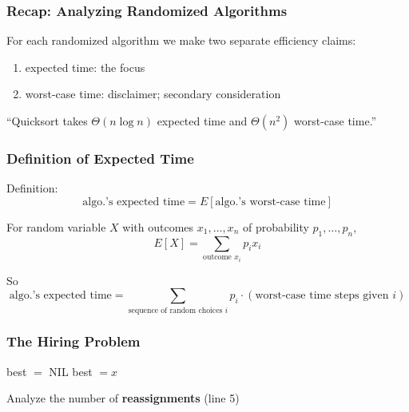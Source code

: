\documentclass[10pt,aspectratio=169]{beamer}
\begin{document}
\begin{frame} \frametitle{Recap: Analyzing Randomized Algorithms}
  For each randomized algorithm we make two separate efficiency claims:
  \begin{enumerate}
    \item expected time: the focus
    \item worst-case time: disclaimer; secondary consideration
  \end{enumerate}
  \vspace{12pt}

  ``Quicksort takes $\Theta(n \log n)$ expected time and $\Theta(n^2)$ worst-case time.''
\end{frame}

\begin{frame} \frametitle{Definition of Expected Time}
  Definition: 
  \[ \text{algo.'s expected time} = E[\text{algo.'s worst-case time}] \]

  For random variable $X$ with outcomes $x_1, \ldots, x_n$ of probability $p_1, \ldots, p_n$,
  \[ E[X] = \sum_{\text{outcome $x_i$}} p_i x_i \]

  So
  \[ \text{algo.'s expected time} = \sum_{\text{sequence of random choices $i$}} p_i \cdot (\text{worst-case time steps given } i) \]

\end{frame}

\begin{frame} \frametitle{The Hiring Problem}
  {\footnotesize
  \begin{algorithmic}[1]
    \State best $ = $ NIL
        \State best $= x$
      \EndIf
    \EndFor
    \State {}
    \EndFunction
  \end{algorithmic}
  }
  \vspace{24pt}

  Analyze the number of \textbf{reassignments} (line 5)
\end{frame}
\end{document}
